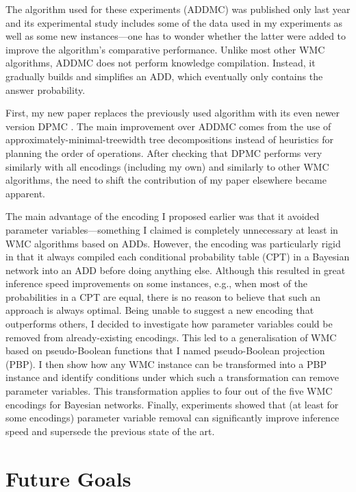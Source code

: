 \documentclass{article}
\begin{document}
{\begin{description}
  The algorithm used for these experiments (ADDMC) was published
  only last year \cite{DBLP:conf/aaai/DudekPV20} and its experimental study
  includes some of the data used in my experiments as well as some new
  instances---one has to wonder whether the latter were added to improve the
  algorithm's comparative performance. Unlike most other WMC algorithms, ADDMC
  does not perform knowledge compilation. Instead, it gradually builds and
  simplifies an ADD, which eventually only contains the answer probability.

  First, my new paper replaces the previously used algorithm with its even newer
  version DPMC \cite{DBLP:conf/cp/DudekPV20}. The main improvement over ADDMC
  comes from the use of approximately-minimal-treewidth tree decompositions
  instead of heuristics for planning the order of operations. After checking
  that DPMC performs very similarly with all encodings (including my own) and
  similarly to other WMC algorithms, the need to shift the contribution of my
  paper elsewhere became apparent.

  The main advantage of the encoding I proposed earlier was that it avoided
  parameter variables---something I claimed is completely unnecessary at
  least in WMC algorithms based on ADDs. However, the encoding was particularly
  rigid in that it always compiled each conditional probability table (CPT) in a
  Bayesian network into an ADD before doing anything else. Although this
  resulted in great inference speed improvements on some instances, e.g., when
  most of the probabilities in a CPT are equal, there is no reason to believe
  that such an approach is always optimal. Being unable to suggest a new
  encoding that outperforms others, I decided to investigate how parameter
  variables could be removed from already-existing encodings. This led to a
  generalisation of WMC based on pseudo-Boolean functions that I named
  pseudo-Boolean projection (PBP). I then show how any WMC instance can be
  transformed into a PBP instance and identify conditions under which such a
  transformation can remove parameter variables. This transformation applies to
  four out of the five WMC encodings for Bayesian networks. Finally, experiments
  showed that (at least for some encodings) parameter variable removal can
  significantly improve inference speed and supersede the previous state of the
  art.
\end{description}

\section{Future Goals} \label{sec:future}

}
\end{document}
